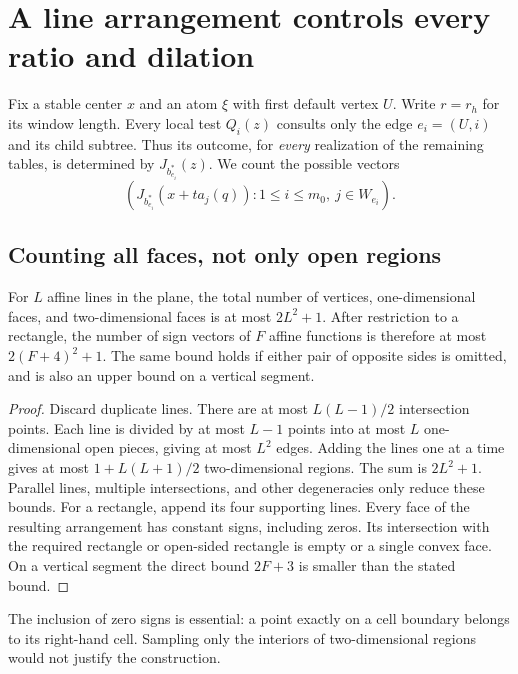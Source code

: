 \section{A line arrangement controls every ratio and dilation}
\label{sec:uniformity}

Fix a stable center $x$ and an atom $\xi$ with first default vertex $U$.
Write $r=r_h$ for its window length. Every local test $Q_i(z)$ consults
only the edge $e_i=(U,i)$ and its child subtree. Thus its outcome, for
\emph{every} realization of the remaining tables, is determined by
$J_{b_{e_i}^*}(z)$. We count the possible vectors
\begin{equation}\label{eq:key-vector}
 \left(J_{b_{e_i}^*}(x+ta_j(q)):
  1\le i\le m_0,\ j\in W_{e_i}\right).
\end{equation}

\subsection{Counting all faces, not only open regions}

\begin{lemma}\label{lem:line-arrangement}
For $L$ affine lines in the plane, the total number of vertices,
one-dimensional faces, and two-dimensional faces is at most $2L^2+1$.
After restriction to a rectangle, the number of sign vectors of $F$
affine functions is therefore at most $2(F+4)^2+1$.
The same bound holds if either pair of opposite sides is omitted, and
is also an upper bound on a vertical segment.
\end{lemma}

\begin{proof}
Discard duplicate lines. There are at most $L(L-1)/2$ intersection
points. Each line is divided by at most $L-1$ points into at most $L$
one-dimensional open pieces, giving at most $L^2$ edges. Adding the
lines one at a time gives at most $1+L(L+1)/2$ two-dimensional regions.
The sum is $2L^2+1$. Parallel lines, multiple intersections, and other
degeneracies only reduce these bounds.
For a rectangle, append its four supporting lines. Every face of the
resulting arrangement has constant signs, including zeros. Its
intersection with the required rectangle or open-sided rectangle is
empty or a single convex face. On a vertical segment the direct bound
$2F+3$ is smaller than the stated bound.
\end{proof}

The inclusion of zero signs is essential: a point exactly on a cell
boundary belongs to its right-hand cell. Sampling only the interiors
of two-dimensional regions would not justify the construction.

